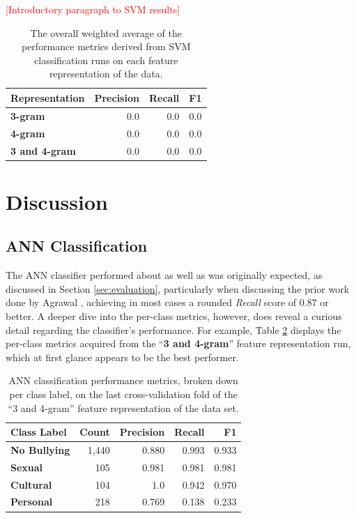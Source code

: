 \documentclass[conference]{sig-alternate-05-2015}
\newcommand{\todo}[1]{{\textcolor{red}{[#1]}}}
\begin{document}
\todo{Introductory paragraph to SVM results}

\begin{table}[ht!]
  \centering
  \begin{tabular}{| l | r | r | r |}
    \hline
    \textbf{Representation} & \textbf{Precision} & \textbf{Recall} & \textbf{F1} \\
    \hline\hline
    \textbf{3-gram} & 0.0 & 0.0 & 0.0 \\
    \hline
    \textbf{4-gram} & 0.0 & 0.0 & 0.0 \\
    \hline
    \textbf{3 and 4-gram} & 0.0 & 0.0 & 0.0 \\
    \hline
  \end{tabular}
  \caption{The overall weighted average of the performance metrics derived from
  SVM classification runs on each feature representation of the data.}
  \label{tab:svm_overall_results}
\end{table}

\section{Discussion}\label{sec:discussion}

\subsection{ANN Classification}\label{subsec:ann_discussion}

The ANN classifier performed about as well as was originally expected, as
discussed in Section \ref{sec:evaluation}, particularly when discussing the
prior work done by Agrawal \cite{agrawal2018deep}, achieving in most cases a
rounded \textit{Recall} score of $0.87$ or better. A deeper dive into the
per-class metrics, however, does reveal a curious detail regarding the
classifier's performance. For example, Table \ref{tab:ann_byclass_results}
displays the per-class metrics acquired from the ``\textbf{3 and 4-gram}''
feature representation run, which at first glance appears to be the best
performer.

\begin{table}[ht!]
  \centering
  \begin{tabular}{| l | r | r | r | r |}
    \hline
    \textbf{Class Label} & \textbf{Count} & \textbf{Precision} & \textbf{Recall} & \textbf{F1} \\
    \hline\hline
    \textbf{No Bullying} & 1,440 & 0.880 & 0.993 & 0.933 \\
    \textbf{Sexual} & 105 & 0.981 & 0.981 & 0.981 \\
    \textbf{Cultural} & 104 & 1.0 & 0.942 & 0.970 \\
    \textbf{Personal} & 218 & 0.769 & 0.138 & 0.233 \\
    \hline
  \end{tabular}
  \caption{ANN classification performance metrics, broken down per class label,
  on the last cross-validation fold of the ``3 and 4-gram'' feature
  representation of the data set.}
  \label{tab:ann_byclass_results}
\end{table}
\end{document}
